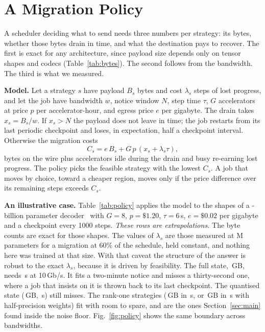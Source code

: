 \section{A Migration Policy}
\label{sec:policy}

A scheduler deciding what to send needs three numbers per strategy: its bytes, whether those bytes drain in time, and
what the destination pays to recover. The first is exact for any architecture, since payload size depends only on
tensor shapes and codecs (Table~\ref{tab:bytes}). The second follows from the bandwidth. The third is what we
measured.

\textbf{Model.} Let a strategy $s$ have payload $B_s$ bytes and cost $\lambda_s$ steps of lost progress, and let the
job have bandwidth $w$, notice window $N$, step time $\tau$, $G$ accelerators at price $p$ per accelerator-hour, and
egress price $e$ per gigabyte. The drain takes $x_s = B_s / w$. If $x_s > N$ the payload does not leave in time; the
job restarts from its last periodic checkpoint and loses, in expectation, half a checkpoint interval. Otherwise the
migration costs
\begin{equation}
C_s = e\,B_s + G\,p\,(x_s + \lambda_s \tau),
\label{eq:cost}
\end{equation}
bytes on the wire plus accelerators idle during the drain and busy re-earning lost progress. The policy picks the
feasible strategy with the lowest $C_s$. A job that moves by choice, toward a cheaper region, moves only if the price
difference over its remaining steps exceeds $C_s$.

\textbf{An illustrative case.} Table~\ref{tab:policy} applies the model to the shapes of a \llamaParams{}-billion
parameter decoder~\cite{touvron2023llama2} with $G = 8$, $p = \$1.20$, $\tau = 6$\,s, $e = \$0.02$ per gigabyte and a
checkpoint every 1000 steps. \emph{These rows are extrapolations.} The byte counts are exact for those shapes. The
values of $\lambda_s$ are those measured at \paramsM{}M parameters for a migration at 60\% of the schedule, held
constant, and nothing here was trained at
that size. With that caveat the structure of the answer is robust to the exact $\lambda_s$, because it is driven by
feasibility. The full state, \llamaFullGB{}\,GB, needs \llamaFullDrain{}\,s at 10\,Gb/s. It fits a two-minute notice and
misses a thirty-second one, where a job that insists on it is thrown back to its last checkpoint. The quantised state
(\llamaQGB{}\,GB, \llamaQDrain{}\,s) still misses. The rank-one strategies (\llamaRankGB{}\,GB in \llamaRankDrain{}\,s,
or \llamaRankBfGB{}\,GB in \llamaRankBfDrain{}\,s with half-precision weights) fit with room to spare, and are the
ones Section~\ref{sec:main} found inside the noise floor. Fig.~\ref{fig:policy} shows the same boundary across
bandwidths.

